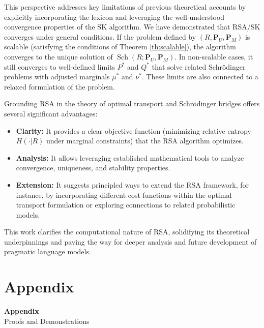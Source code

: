 \documentclass{article}
\begin{document}
This perspective addresses key limitations of previous theoretical accounts by explicitly incorporating the lexicon and leveraging the well-understood convergence properties of the SK algorithm. We have demonstrated that RSA/SK converges under general conditions. If the problem defined by $(R, \mathbf{P}_U, \mathbf{P}_M)$ is scalable (satisfying the conditions of Theorem \ref{th:scalable}), the algorithm converges to the unique solution of $\operatorname{Sch}(R; \mathbf{P}_U, \mathbf{P}_M)$. In non-scalable cases, it still converges to well-defined limits $P^*$ and $Q^*$ that solve related Schrödinger problems with adjusted marginals $\mu^*$ and $\nu^*$. These limits are also connected to a relaxed formulation of the problem.

Grounding RSA in the theory of optimal transport and Schrödinger bridges offers several significant advantages:
\begin{itemize}
    \item \textbf{Clarity:} It provides a clear objective function (minimizing relative entropy $H(\cdot | R)$ under marginal constraints) that the RSA algorithm optimizes.
    \item \textbf{Analysis:} It allows leveraging established mathematical tools to analyze convergence, uniqueness, and stability properties.
    \item \textbf{Extension:} It suggests principled ways to extend the RSA framework, for instance, by incorporating different cost functions within the optimal transport formulation or exploring connections to related probabilistic models.
\end{itemize}
This work clarifies the computational nature of RSA, solidifying its theoretical underpinnings and paving the way for deeper analysis and future development of pragmatic language models.

\cleardoublepage
{}
{} %

\cleardoublepage %
\appendix
{} %
\section*{Appendix} %
\begin{center}
    {\LARGE \textbf{Appendix}} \\ %
    \vspace{1cm}
    {\large Proofs and Demonstrations}
\end{center}
\end{document}
